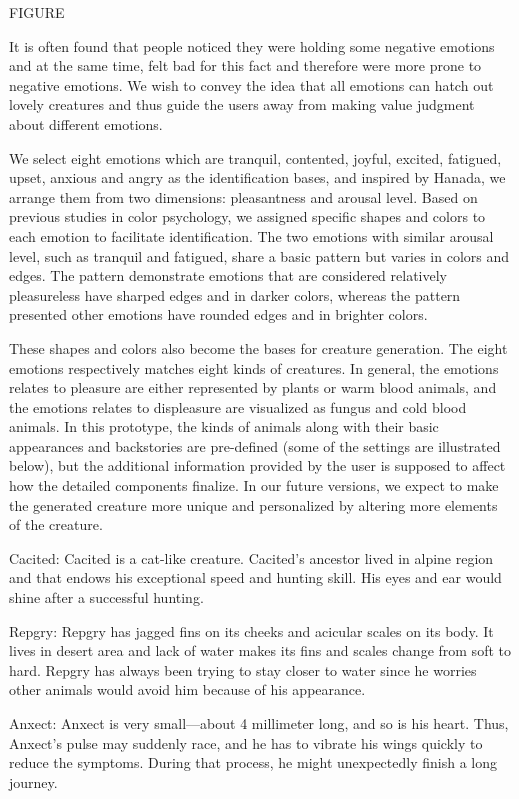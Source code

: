 \documentclass[manuscript,screen]{acmart}
\begin{document}
FIGURE

It is often found that people noticed they were holding some negative emotions and at the same time, felt bad for this fact and therefore were more prone to negative emotions. We wish to convey the idea that all emotions can hatch out lovely creatures and thus guide the users away from making value judgment about different emotions.

We select eight emotions which are tranquil, contented, joyful, excited, fatigued, upset, anxious and angry as the identification bases, and inspired by Hanada,\cite{hanada2018correspondence}
we arrange them from two dimensions: pleasantness and arousal level. Based on previous studies in color psychology,\cite{valdez1994effects}
we assigned specific shapes and colors to each emotion to facilitate identification. The two emotions with similar arousal level, such as tranquil and fatigued, share a basic pattern but varies in colors and edges. The pattern demonstrate emotions that are considered relatively pleasureless have sharped edges and in darker colors, whereas the pattern presented other emotions have rounded edges and in brighter colors. 

These shapes and colors also become the bases for creature generation. The eight emotions respectively matches eight kinds of creatures. In general, the emotions relates to pleasure are either represented by plants or warm blood animals, and the emotions relates to displeasure are visualized as fungus and cold blood animals. In this prototype, the kinds of animals along with their basic appearances and backstories are pre-defined (some of the settings are illustrated below), but the additional information provided by the user is supposed to affect how the detailed components finalize. In our future versions, we expect to make the generated creature more unique and personalized by altering more elements of the creature.

Cacited: Cacited is a cat-like creature. Cacited’s ancestor lived in alpine region and that endows his exceptional speed and hunting skill. His eyes and ear would shine after a successful hunting.

Repgry: Repgry has jagged fins on its cheeks and acicular scales on its body. It lives in desert area and lack of water makes its fins and scales change from soft to hard. Repgry has always been trying to stay closer to water since he worries other animals would avoid him because of his appearance.

Anxect: Anxect is very small—about 4 millimeter long, and so is his heart. Thus, Anxect’s pulse may suddenly race, and he has to vibrate his wings quickly to reduce the symptoms. During that process, he might unexpectedly finish a long journey. 
\end{document}
